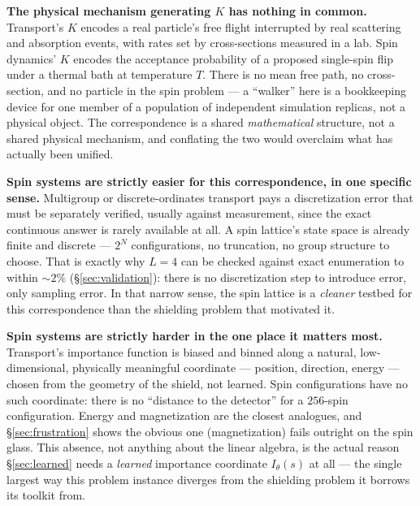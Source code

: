 \documentclass[11pt,a4paper]{article}
\begin{document}
\textbf{The physical mechanism generating $K$ has nothing in common.} Transport's $K$ encodes a
real particle's free flight interrupted by real scattering and absorption events, with rates set
by cross-sections measured in a lab. Spin dynamics' $K$ encodes the acceptance probability of a
proposed single-spin flip under a thermal bath at temperature $T$. There is no mean free path, no
cross-section, and no particle in the spin problem --- a ``walker'' here is a bookkeeping device
for one member of a population of independent simulation replicas, not a physical object. The
correspondence is a shared \emph{mathematical} structure, not a shared physical mechanism, and
conflating the two would overclaim what has actually been unified.

\textbf{Spin systems are strictly easier for this correspondence, in one specific sense.}
Multigroup or discrete-ordinates transport pays a discretization error that must be separately
verified, usually against measurement, since the exact continuous answer is rarely available at
all. A spin lattice's state space is already finite and discrete --- $2^N$ configurations, no
truncation, no group structure to choose. That is exactly why $L=4$ can be checked against exact
enumeration to within $\sim2\%$ (\S\ref{sec:validation}): there is no discretization step to
introduce error, only sampling error. In that narrow sense, the spin lattice is a \emph{cleaner}
testbed for this correspondence than the shielding problem that motivated it.

\textbf{Spin systems are strictly harder in the one place it matters most.} Transport's
importance function is biased and binned along a natural, low-dimensional, physically meaningful
coordinate --- position, direction, energy --- chosen from the geometry of the shield, not
learned. Spin configurations have no such coordinate: there is no ``distance to the detector''
for a $256$-spin configuration. Energy and magnetization are the closest analogues, and
\S\ref{sec:frustration} shows the obvious one (magnetization) fails outright on the spin glass.
This absence, not anything about the linear algebra, is the actual reason
\S\ref{sec:learned} needs a \emph{learned} importance coordinate $I_\theta(s)$ at all --- the
single largest way this problem instance diverges from the shielding problem it borrows its
toolkit from.
\end{document}
